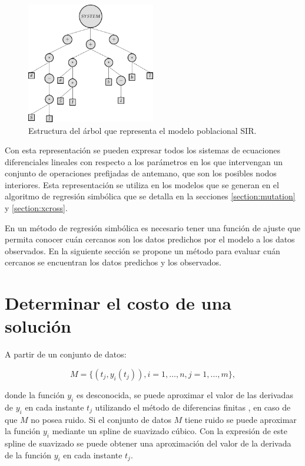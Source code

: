 \begin{figure}[h]
    \centering
    \includegraphics[width=0.5\textwidth]{"figures/sir_example.pdf"}
    \caption{Estructura del árbol que representa el modelo poblacional SIR.}
    \label{tikzpicture:sir_example}
\end{figure}

Con esta representación se pueden expresar todos los sistemas de ecuaciones diferenciales lineales con respecto a los parámetros en los que intervengan un conjunto de operaciones prefijadas de antemano, que son los posibles nodos interiores. Esta representación se utiliza en los modelos que se generan en el algoritmo de regresión simbólica que se detalla en la secciones \ref{section:mutation} y \ref{section:xcross}.

En un método de regresión simbólica es necesario tener una función de ajuste que permita conocer cuán cercanos son los datos predichos por el modelo a los datos observados. En la siguiente sección se propone un método para evaluar cuán cercanos se encuentran los datos predichos y los observados.

\section{Determinar el costo de una solución}\label{section:solution_cost}

A partir de un conjunto de datos:

$$M = \{(t_j, y_i(t_j)), i = 1, \dots, n, j = 1, \dots, m\},$$

donde la función $y_i$ es desconocida, se puede aproximar el valor de las derivadas de $y_i$ en cada instante $t_j$ utilizando el método de diferencias finitas \cite{gaucel2014learning}, en caso de que $M$ no posea ruido. Si el conjunto de datos $M$ tiene ruido se puede aproximar la función $y_i$ mediante un spline de suavizado cúbico. Con la expresión de este spline de suavizado se puede obtener una aproximación del valor de la derivada de la función $y_i$ en cada instante $t_j$.

